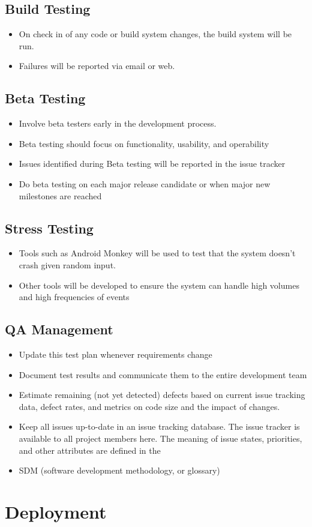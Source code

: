 \documentclass[11pt]{article}
\begin{document}
\subsection{Build Testing}

\begin{itemize}
\item On check in of any code or build system changes, the build system will be run.
\item Failures will be reported via email or web.
\end{itemize}

\subsection{Beta Testing}

\begin{itemize}
\item Involve beta testers early in the development process.
\item Beta testing should focus on functionality, usability, and operability
\item Issues identified during Beta testing will be reported in the issue tracker
\item Do beta testing on each major release candidate or when major new milestones are reached
\end{itemize}

\subsection{Stress Testing}

\begin{itemize}
\item Tools such as Android Monkey will be used to test that the system doesn't crash given random input.
\item Other tools will be developed to ensure the system can handle high volumes and high frequencies of events
\end{itemize}

\subsection{QA Management}
\begin{itemize}
\item Update this test plan whenever requirements change
\item Document test results and communicate them to the entire development team
\item Estimate remaining (not yet detected) defects based on current issue tracking data, defect rates, and metrics on code size and the impact of changes.
\item Keep all issues up-to-date in an issue tracking database. The issue tracker is available to all project members here. The meaning of issue states, priorities, and other attributes are defined in the \item SDM (software development methodology, or glossary)
\end{itemize}

\section{Deployment}
\end{document}
